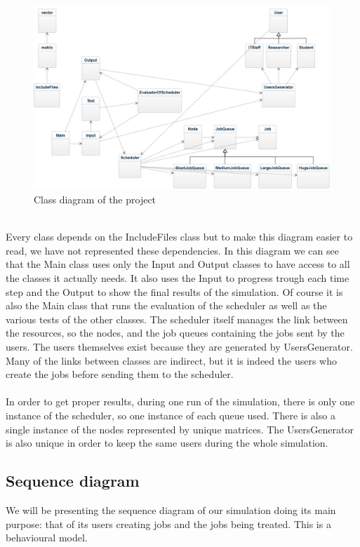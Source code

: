 \documentclass [10 pt, a4 paper]{report}
\begin{document}
\begin{figure}[!htbp]
\centering
\includegraphics[width=1.3\textwidth]{umlDiagram.jpg}
\caption{\label{fig:image} Class diagram of the project}
\end{figure}
\\

\noindent
Every class depends on the IncludeFiles class but to make this diagram easier to read, we have not represented these dependencies. In this diagram we can see that the Main class uses only the Input and Output classes to have access to all the classes it actually needs. It also uses the Input to progress trough each time step and the Output to show the final results of the simulation. Of course it is also the Main class that runs the evaluation of the scheduler as well as the various tests of the other classes. The scheduler itself manages the link between the resources, so the nodes, and the job queues containing the jobs sent by the users. The users themselves exist because they are generated by UsersGenerator. Many of the links between classes are indirect, but it is indeed the users who create the jobs before sending them to the scheduler. 
\\ \\
In order to get proper results, during one run of the simulation, there is only one instance of the scheduler, so one instance of each queue used. There is also a single instance of the nodes represented by unique matrices. The UsersGenerator is also unique in order to keep the same users during the whole simulation.



\clearpage
\noindent

\subsection{Sequence diagram}
We will be presenting the sequence diagram of our simulation doing its main purpose: that of its users creating jobs and the jobs being treated. This is a behavioural model.
\end{document}
